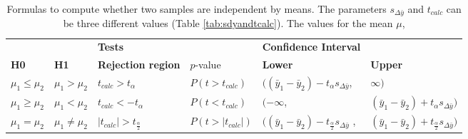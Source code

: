 \documentclass[10pt,a4paper]{report}
\begin{document}
	\begin{table}[h!]
		\centering
		\caption{Formulas to compute whether two samples are independent by means. 
			The parameters $s_{\Delta\bar{y}}$ and $t_{calc}$ can be three different 
			values (Table \ref{tab:sdyandtcalc})\cite{heiberger2004statistical}. The values for the mean $\mu$, }
		\label{tab:IndepTest}
		\begin{tabular}{llllll}
			\hline
			&  & 
			\multicolumn{2}{l}{\textbf{Tests}} & 
			\textbf{Confidence Interval} & \textbf{}               \\ \cline{3-6} 
			\textbf{H0}              & \textbf{H1}              & \textbf{Rejection 
				region}   & $p$-value                      & 
			\textbf{Lower}               & \textbf{Upper}          \\ \hline
			$\mu_1 \leq \mu_2$                  & $\mu_1 > \mu_2$       & 
			$t_{calc} 
			> t_\alpha$       & $P(t > t_{calc})$      & 
			$((\bar{y}_1 
			- \bar{y}_2) - t_\alpha s_{\Delta \bar{y}}$,       & 
			$\infty)$                     \\
			$\mu_1 \geq \mu_2$                  & $\mu_1 < \mu_2$          & 
			$t_{calc} 
			< -t_\alpha$          & $P(t < t_{calc})$         & 
			$(-\infty$,                        & $(\bar{y}_1 - \bar{y}_2) + 
			t_\alpha 
			s_{\Delta \bar{y}})$ \\
			$\mu_1 = \mu_2$                  & $\mu_1 \neq \mu_2$                  
			& 
			$|t_{calc}| > t_{\frac{\alpha}{2}}$     & $P(t >
			|t_{calc}|)$  & $((\bar{y}_1 - \bar{y}_2) - 
			t_{\frac{\alpha}{2}} 
			s_{\Delta\bar{y}}$ 
			,     & $(\bar{y}_1 - \bar{y}_2) + t_{\frac{\alpha}{2}} 
			s_{\Delta 
				\bar{y}})$  
			\\ 
			\hline
		\end{tabular}
	\end{table}
	
\end{document}
